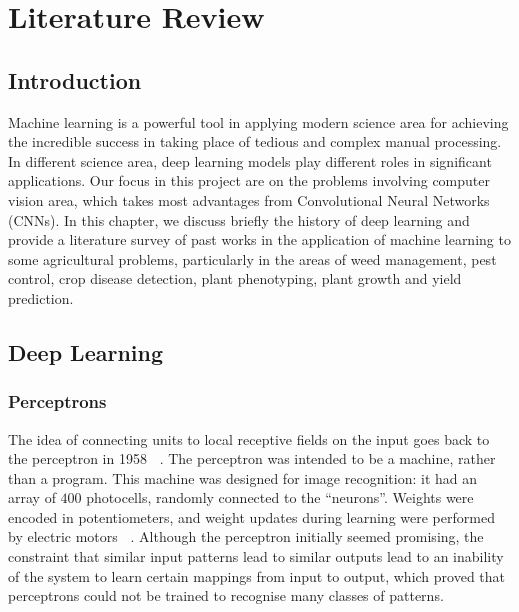 \documentclass[12pt]{report}
\numberwithin{equation}{section}
\begin{document}













\chapter{Literature Review}
\setcounter{section}{-1}
\section{Introduction}
Machine learning is a powerful tool in applying modern science area for achieving the incredible success in taking place of tedious and complex manual processing. In different science area, deep learning models play different roles in significant applications. Our focus in this project are on the problems involving computer vision area, which takes most advantages from Convolutional Neural Networks (CNNs). In this chapter, we discuss briefly the history of deep learning and provide a literature survey of past works in the application of machine learning to some agricultural problems, particularly in the areas of weed management, pest control, crop disease detection, plant phenotyping, plant growth and yield prediction.

\section{Deep Learning}
\subsection{Perceptrons}
The idea of connecting units to local receptive fields on the input goes back to the perceptron in 1958 \textbf{~\cite{Rosenblatt58theperceptron}}. The perceptron was intended to be a machine, rather than a program. This machine was designed for image recognition: it had an array of $400$ photocells, randomly connected to the ``neurons''. Weights were encoded in potentiometers, and weight updates during learning were performed by electric motors \textbf{~\cite{10.5555/1162264}}. Although the perceptron initially seemed promising, the constraint that similar input patterns lead to similar outputs lead to an inability of the system to learn certain mappings from input to output, which proved that perceptrons could not be trained to recognise many classes of patterns. 
\end{document}
